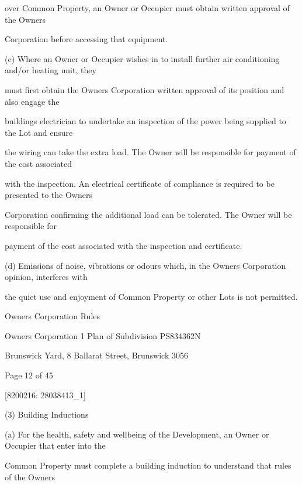 \documentclass{article}
\begin{document}
{\fontsize{10.02}{1}over Common Property, an Owner or Occupier must obtain written approval of the Owners }

{\fontsize{10.02}{1}Corporation before accessing that equipment. }

{\fontsize{9.962}{1}(c) Where an Owner or Occupier wishes in to install further air conditioning and/or heating unit, they }

{\fontsize{10.02}{1}must first obtain the Owners Corporation written approval of its position and also engage the }

{\fontsize{10.02}{1}buildings electrician to undertake an inspection of the power being supplied to the Lot and ensure }

{\fontsize{10.02}{1}the wiring can take the extra load. The Owner will be responsible for payment of the cost associated }

{\fontsize{10.02}{1}with the inspection. An electrical certificate of compliance is required to be presented to the Owners }

{\fontsize{10.02}{1}Corporation confirming the additional load can be tolerated. The Owner will be responsible for }

{\fontsize{10.02}{1}payment of the cost associated with the inspection and certificate. }

{\fontsize{9.962}{1}(d) Emissions of noise, vibrations or odours which, in the Owners Corporation opinion, interferes with }

{\fontsize{10.02}{1}the quiet use and enjoyment of Common Property or other Lots is not permitted. }

\newpage





{\fontsize{9}{1}Owners Corporation Rules }

{\fontsize{9}{1}Owners Corporation 1 Plan of Subdivision PS834362N }

{\fontsize{9}{1}Brunswick Yard, 8 Ballarat Street, Brunswick 3056 }


{\fontsize{9}{1}Page 12  of 45 }



{\fontsize{7.02}{1}[8200216: 28038413\_1] }

{\fontsize{9.962}{1}(3) Building Inductions }

{\fontsize{9.962}{1}(a) For the health, safety and wellbeing of the Development, an Owner or Occupier that enter into the }

{\fontsize{10.02}{1}Common Property must complete a building induction to understand that rules of the Owners }
\end{document}
